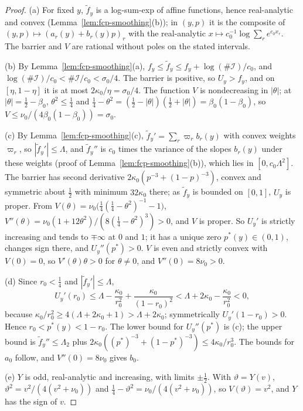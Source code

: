 \begin{proof}
(a) For fixed $y$, $\tilde f_y$ is a log-sum-exp of affine functions, hence real-analytic and convex
(Lemma~\ref{lem:fcp-smoothing}(b)); in $(y,p)$ it is the composite of $(y,p)\mapsto(a_r(y)+b_r(y)p)_r$ with the
real-analytic $x\mapsto c_0^{-1}\log\sum_re^{c_0x_r}$. The barrier and $V$ are rational without poles on the stated intervals.

(b) By Lemma~\ref{lem:fcp-smoothing}(a), $f_y\le \tilde f_y\le f_y+\log(\#\mathcal I)/c_0$, and $\log(\#\mathcal I)/c_0<\#\mathcal I/c_0<\sigma_0/4$. The barrier is
positive, so $U_y>f_y$, and on $[\eta,1-\eta]$ it is at most $2\kappa_0/\eta=\sigma_0/4$. The function $V$ is nondecreasing in
$|\theta|$; at $|\theta|=\frac12-\beta_0$, $\theta^2\le\frac14$ and $\frac14-\theta^2=(\frac12-|\theta|)(\frac12+|\theta|)=\beta_0(1-\beta_0)$,
so $V\le\nu_0/(4\beta_0(1-\beta_0))=\sigma_0$.

(c) By Lemma~\ref{lem:fcp-smoothing}(c), $\tilde f_y'=\sum_r\varpi_rb_r(y)$ with convex weights $\varpi_r$, so
$|\tilde f_y'|\le\Lambda$, and $\tilde f_y''$ is $c_0$ times the variance of the slopes $b_r(y)$ under these weights (proof of
Lemma~\ref{lem:fcp-smoothing}(b)), which lies in $[0,c_0\Lambda^2]$. The barrier has second derivative
$2\kappa_0(p^{-3}+(1-p)^{-3})$, convex and symmetric about $\frac12$ with minimum $32\kappa_0$ there; as $\tilde f_y$ is bounded on
$[0,1]$, $U_y$ is proper. From $V(\theta)=\nu_0\bigl(\frac14(\frac14-\theta^2)^{-1}-1\bigr)$,
$V''(\theta)=\nu_0(1+12\theta^2)/(8(\frac14-\theta^2)^3)>0$, and $V$ is proper. So $U_y'$ is strictly increasing and tends to
$\mp\infty$ at $0$ and $1$; it has a unique zero $p^*(y)\in(0,1)$, changes sign there, and $U_y''(p^*)>0$. $V$ is even and
strictly convex with $V(0)=0$, so $V'(\theta)\theta>0$ for $\theta\ne0$, and $V''(0)=8\nu_0>0$.

(d) Since $r_0<\frac14$ and $|\tilde f_y'|\le\Lambda$,
\[
 U_y'(r_0)\le\Lambda-\frac{\kappa_0}{r_0^2}+\frac{\kappa_0}{(1-r_0)^2}<\Lambda+2\kappa_0-\frac{\kappa_0}{r_0^2}<0,
\]
because $\kappa_0/r_0^2\ge4(\Lambda+2\kappa_0+1)>\Lambda+2\kappa_0$; symmetrically $U_y'(1-r_0)>0$. Hence
$r_0<p^*(y)<1-r_0$. The lower bound for $U_y''(p^*)$ is (c); the upper bound is $\tilde f_y''\le\Lambda_2$ plus
$2\kappa_0((p^*)^{-3}+(1-p^*)^{-3})\le4\kappa_0/r_0^3$. The bounds for $a_0$ follow, and $V''(0)=8\nu_0$ gives $b_0$.

(e) $Y$ is odd, real-analytic and increasing, with limits $\pm\frac12$. With $\vartheta=Y(v)$, $\vartheta^2=v^2/(4(v^2+\nu_0))$ and
$\frac14-\vartheta^2=\nu_0/(4(v^2+\nu_0))$, so $V(\vartheta)=v^2$, and $Y$ has the sign of $v$.


\end{proof}
